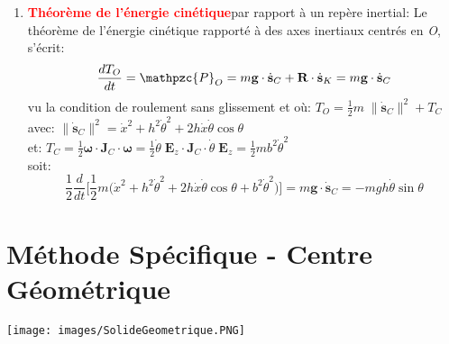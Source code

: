 \documentclass[a4paper]{article}
\begin{document}
\begin{enumerate}
\item \textcolor{red}{\textbf{Théorème de l’énergie cinétique}}\footnotemark[\value{footnote}] par rapport à un repère inertial: Le théorème de l’énergie cinétique rapporté à des axes inertiaux centrés en \emph{O}, s’écrit:
\[ \frac{d T_O}{d t} = \mathpzc{P}_O = m \textbf{g} \cdot \dot{\textbf{s}}_C + \textbf{R} \cdot \dot{\textbf{s}}_K = m \textbf{g} \cdot \dot{\textbf{s}}_C \]
vu la condition de roulement sans glissement et où: $\displaystyle T_O = \frac{1}{2} m \; \| \dot{\textbf{s}}_C \|^2 + T_C $ \\
avec: $ \| \dot{\textbf{s}}_C \|^2 = \dot{x}^2 + h^2 \dot{\theta}^2 + 2 h \dot{x} \dot{\theta} \cos \theta $ \\

et: $\displaystyle T_C = \frac{1}{2} \boldsymbol{\omega} \cdot \textbf{J}_C \cdot \boldsymbol{\omega} = \frac{1}{2} \dot{\theta} \; \textbf{E}_z \cdot \textbf{J}_C \cdot \dot{\theta} \; \textbf{E}_z = \frac{1}{2} m b^2 \dot{\theta}^2 $ \\
soit:
\[ \frac{1}{2} \frac{d}{d t} \bigg[ \frac{1}{2} m \big( \dot{x}^2 + h^2 \dot{\theta}^2 + 2 h \dot{x} \dot{\theta} \cos \theta + b^2 \dot{\theta}^2 \big) \bigg] = m \textbf{g} \cdot \dot{\textbf{s}}_C = - m g h \dot{\theta} \sin \theta \]





\end{enumerate}\section{Méthode Spécifique - Centre Géométrique} %





\begin{center}
\texttt{[image: images/SolideGeometrique.PNG]}
\end{center}
\end{document}
